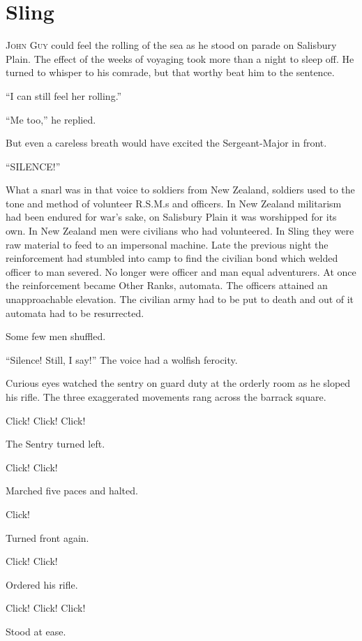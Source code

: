 \chapter*{\textsf{Sling}}

J\textsc{ohn} G\textsc{uy} could feel the rolling of the sea as he stood on parade on Salisbury Plain. 
The effect of the weeks of voyaging took more than a night to sleep off. He turned 
to whisper to his comrade, but that worthy beat him to the sentence.

``I can still feel her rolling.''

``Me too,'' he replied.

But even a careless breath would have excited the Sergeant-Major in front.

``SILENCE!''

What a snarl was in that voice to soldiers from New Zealand, soldiers used to the tone and method of
volunteer R.S.M.s and officers. In New Zealand militarism had been endured for war's sake, on 
Salisbury Plain it was worshipped for its own. In New Zealand men were civilians who 
had volunteered. In Sling they were raw material to feed to an impersonal machine. Late 
the previous night the reinforcement had stumbled into camp to find the civilian bond 
which welded officer to man severed. No longer were officer and man equal adventurers. 
At once the reinforcement became Other Ranks, automata. The officers attained an 
unapproachable elevation. The civilian army had to be put to death and out of it 
automata had to be resurrected.

Some few men shuffled.

``Silence! Still, I say!'' The voice had a wolfish ferocity.

Curious eyes watched the sentry on guard duty at the orderly room as he sloped 
his rifle. The three exaggerated movements rang across the barrack square.

Click! Click! Click!

The Sentry turned left.

Click! Click!

Marched five paces and halted.

Click!

Turned front again.

Click! Click!

Ordered his rifle.

Click! Click! Click!

Stood at ease.

